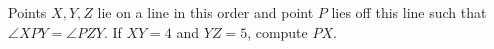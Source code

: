 Points $X,Y,Z$ lie on a line in this order and point $P$ lies off this line such that $\angle{XPY}=\angle{PZY}$. If $XY=4$ and $YZ=5$, compute $PX$.